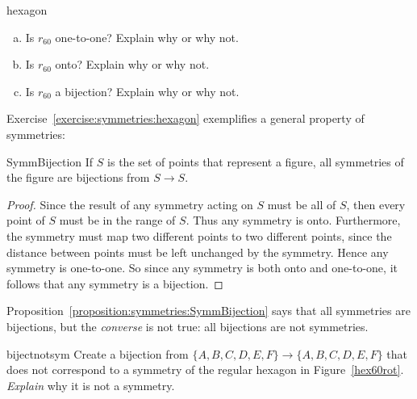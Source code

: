 \begin{exercise}{hexagon}
\begin{enumerate}[(a)]
\item
Is $r_{60}$ one-to-one?  Explain why or why not.
\item
Is $r_{60}$ onto?  Explain why or why not.
\item
Is $r_{60}$ a bijection?  Explain why or why not.

\end{enumerate}
\end{exercise}

Exercise~\ref{exercise:symmetries:hexagon} exemplifies a general property of symmetries:

\begin{prop}{SymmBijection}  
If $S$ is the set of points that represent a figure, all symmetries of the figure are bijections from $S \to S$.
\end{prop}

\begin{proof}
Since the result of any symmetry acting on $S$ must be all of $S$, then every point of $S$ must be in the range of $S$. Thus any symmetry is onto. Furthermore, the symmetry must map two different points to two different points, since the distance between points must be left unchanged by the symmetry. Hence any symmetry is one-to-one.  So since any symmetry is both onto and one-to-one, it follows that any symmetry is a bijection.
\end{proof}
\medskip

Proposition~\ref{proposition:symmetries:SymmBijection} says that all symmetries are bijections, but the \emph{converse} is not true: all bijections are not symmetries. 

\begin{exercise}{bijectnotsym}
 Create a bijection from $\{A,B,C,D,E,F\} \to \{A,B,C,D,E,F\}$ that does not correspond to a symmetry of the regular hexagon in  Figure~\ref{hex60rot}. \emph{Explain} why it is not a symmetry.
\end{exercise}

